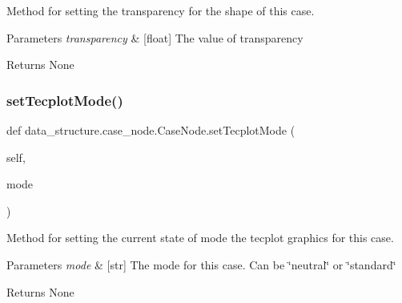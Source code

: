Method for setting the transparency for the shape of this case. 


\begin{DoxyParams}{Parameters}
{\em transparency} & \mbox{[}float\mbox{]} The value of transparency \\
\hline
\end{DoxyParams}
\begin{DoxyReturn}{Returns}
None 
\end{DoxyReturn}
\hypertarget{classdata__structure_1_1case__node_1_1_case_node_a18f8a870b09f2ec7c25bde6da6ad4d77}{}\label{classdata__structure_1_1case__node_1_1_case_node_a18f8a870b09f2ec7c25bde6da6ad4d77} 
\subsubsection{\texorpdfstring{set\+Tecplot\+Mode()}{setTecplotMode()}}
{\footnotesize\ttfamily def data\+\_\+structure.\+case\+\_\+node.\+Case\+Node.\+set\+Tecplot\+Mode (\begin{DoxyParamCaption}\item[{}]{self,  }\item[{}]{mode }\end{DoxyParamCaption})}



Method for setting the current state of mode the tecplot graphics for this case. 


\begin{DoxyParams}{Parameters}
{\em mode} & \mbox{[}str\mbox{]} The mode for this case. Can be \char`\"{}neutral\char`\"{} or \char`\"{}standard\char`\"{} \\
\hline
\end{DoxyParams}
\begin{DoxyReturn}{Returns}
None 
\end{DoxyReturn}
\hypertarget{classdata__structure_1_1case__node_1_1_case_node_aca41f53412a5bfdc6e3ced0ddaf3d2b3}{}\label{classdata__structure_1_1case__node_1_1_case_node_aca41f53412a5bfdc6e3ced0ddaf3d2b3} 
